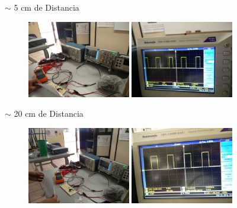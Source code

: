 \documentclass[12pt, fleqn]{article}                            %
\theoremstyle{break}                                            %
\begin{document}
        $\sim$ 5 cm de Distancia
        \begin{figure}[h]
            \includegraphics[width=0.4\textwidth]{3Distance}
            \includegraphics[width=0.4\textwidth]{3Signal}
        \end{figure}


        $\sim$ 20 cm de Distancia
        \begin{figure}[h]
            \includegraphics[width=0.4\textwidth]{5Distance}
            \includegraphics[width=0.4\textwidth]{5Signal}
        \end{figure}

        
        \clearpage
\end{document}
